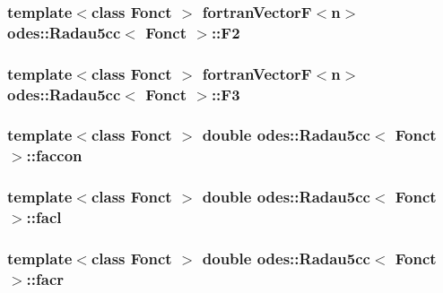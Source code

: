 \hypertarget{classodes_1_1Radau5cc_a7937b348a68aae3a31a1324a9c385bfa}{
\subsubsection[{F2}]{\setlength{\rightskip}{0pt plus 5cm}template$<$class Fonct $>$ {\bf fortran\-Vector\-F}$<${\bf n}$>$ {\bf odes\-::\-Radau5cc}$<$ Fonct $>$\-::F2\hspace{0.3cm}{\ttfamily [protected]}}}\label{classodes_1_1Radau5cc_a7937b348a68aae3a31a1324a9c385bfa}
\hypertarget{classodes_1_1Radau5cc_a1382307c537eb6d6747b1b68b9a977ff}{
\subsubsection[{F3}]{\setlength{\rightskip}{0pt plus 5cm}template$<$class Fonct $>$ {\bf fortran\-Vector\-F}$<${\bf n}$>$ {\bf odes\-::\-Radau5cc}$<$ Fonct $>$\-::F3\hspace{0.3cm}{\ttfamily [protected]}}}\label{classodes_1_1Radau5cc_a1382307c537eb6d6747b1b68b9a977ff}
\hypertarget{classodes_1_1Radau5cc_ae3cb85f022d29c80ae8f980e57f1bbf5}{
\subsubsection[{faccon}]{\setlength{\rightskip}{0pt plus 5cm}template$<$class Fonct $>$ double {\bf odes\-::\-Radau5cc}$<$ Fonct $>$\-::faccon\hspace{0.3cm}{\ttfamily [private]}}}\label{classodes_1_1Radau5cc_ae3cb85f022d29c80ae8f980e57f1bbf5}
\hypertarget{classodes_1_1Radau5cc_a13fe7121c4b03dca25bfb7b362032182}{
\subsubsection[{facl}]{\setlength{\rightskip}{0pt plus 5cm}template$<$class Fonct $>$ double {\bf odes\-::\-Radau5cc}$<$ Fonct $>$\-::facl\hspace{0.3cm}{\ttfamily [private]}}}\label{classodes_1_1Radau5cc_a13fe7121c4b03dca25bfb7b362032182}
\hypertarget{classodes_1_1Radau5cc_a2bda7f90bc9aabbc2d98ff14daeaa491}{
\subsubsection[{facr}]{\setlength{\rightskip}{0pt plus 5cm}template$<$class Fonct $>$ double {\bf odes\-::\-Radau5cc}$<$ Fonct $>$\-::facr\hspace{0.3cm}{\ttfamily [private]}}}\label{classodes_1_1Radau5cc_a2bda7f90bc9aabbc2d98ff14daeaa491}
